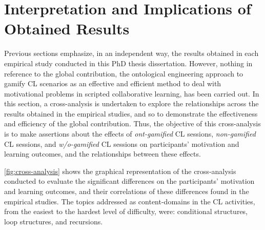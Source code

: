 \newpage
\section{Interpretation and Implications of Obtained Results}
\label{sec:interpretation-implications} 

Previous sections emphasize, in an independent way, the results obtained in each empirical study conducted in this PhD thesis dissertation.
However, nothing in reference to the global contribution, the ontological engineering approach to gamify CL scenarios as an effective and efficient method to deal with motivational problems in scripted collaborative learning, has been carried out.
In this section, a cross-analysis is undertaken to explore the relationships across the results obtained in the empirical studies, and so to demonstrate the effectiveness and efficiency of the global contribution.
Thus, the objective of this cross-analysis is to make assertions about the effects of \emph{ont-gamified} CL sessions, \emph{non-gamified} CL sessions, and \emph{w/o-gamified} CL sessions on participants' motivation and learning outcomes, and the relationships between these effects.

\autoref{fig:cross-analysis} shows the graphical representation of the cross-analysis conducted to evaluate the significant differences on the participants' motivation and learning outcomes, and their correlations of these differences found in the empirical studies.
The topics addressed as content-domains in the CL activities, from the easiest to the hardest level of difficulty, were: conditional structures, loop structures, and recursions.


